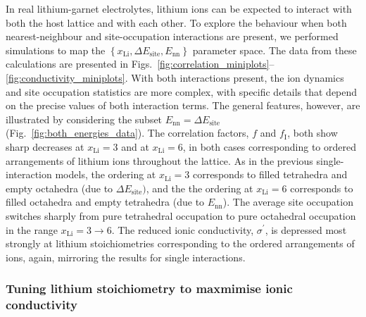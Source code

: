 \documentclass[aps,prb,twocolumn,superscriptaddress,reprint]{revtex4-1}
\newcommand{\xLi}{x_\m{Li}}
\newcommand{\m}[1]{\mathrm{#1}}
\begin{document}
In real lithium-garnet electrolytes, lithium ions can be expected to interact with both the host lattice and with each other. To explore the behaviour when both nearest-neighbour and site-occupation interactions are present, we performed simulations to map the $\left\{\xLi, \Delta E_\m{site}, E_\m{nn}\right\}$ parameter space. 
The data from these calculations are presented in Figs.~\ref{fig:correlation_miniplots}--\ref{fig:conductivity_miniplots}. With both interactions present, the ion dynamics and site occupation statistics are  more complex, with specific details that depend on the precise values of both interaction terms. The general features, however, are illustrated by considering the subset $E_\m{nn}=\Delta E_\m{site}$ (Fig.~\ref{fig:both_energies_data}). The correlation factors, $f$ and $f_\m{I}$, both show sharp decreases at $\xLi=3$ and at $\xLi=6$, in both cases corresponding to ordered arrangements of lithium ions throughout the lattice. As in the previous single-interaction models, the ordering at $\xLi=3$ corresponds to filled tetrahedra and empty octahedra (due to $\Delta E_\m{site})$, and the the ordering at $\xLi=6$ corresponds to filled octahedra and empty tetrahedra (due to $E_\m{nn}$). The average site occupation switches sharply from pure tetrahedral occupation to pure octahedral occupation in the range $\xLi=3\to6$. The reduced ionic conductivity, $\sigma^\prime$, is depressed most strongly at lithium stoichiometries corresponding to the ordered arrangements of ions, again, mirroring the results for single interactions. 

\subsubsection{Tuning lithium stoichiometry to maxmimise ionic conductivity}
\end{document}
